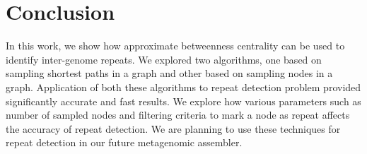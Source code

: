 \documentclass[runningheads,a4paper]{llncs}
\begin{document}
\section{Conclusion}
In this work, we show how approximate betweenness centrality can be used to identify inter-genome repeats. We explored two algorithms, one based on sampling shortest paths in a graph and other based on sampling nodes in a graph. Application of both these algorithms to repeat detection problem provided significantly accurate and fast results. We explore how various parameters such as number of sampled nodes and filtering criteria to mark a node as repeat affects the accuracy of repeat detection. We are planning to use these techniques for repeat detection in our future metagenomic assembler. 
{}

\end{document}
